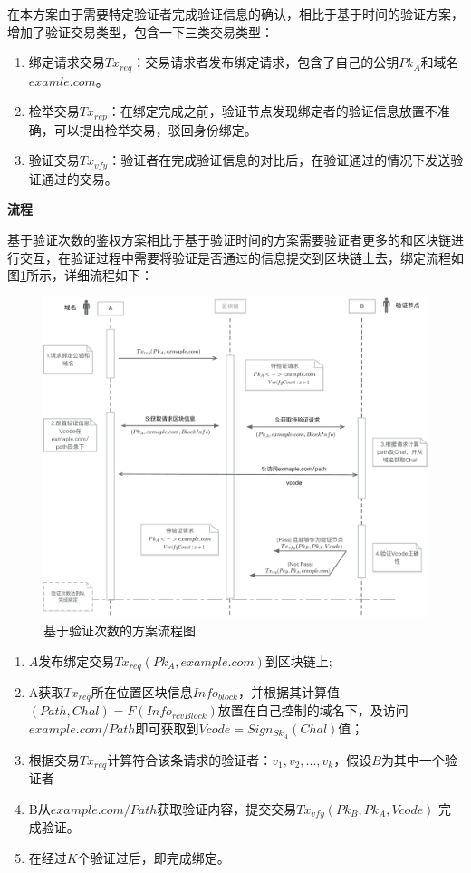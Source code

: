 在本方案由于需要特定验证者完成验证信息的确认，相比于基于时间的验证方案，增加了验证交易类型，包含一下三类交易类型：

\begin{enumerate}
	\item 绑定请求交易$Tx_{req}$：交易请求者发布绑定请求，包含了自己的公钥$Pk_A$和域名$examle.com$。
	\item 检举交易$Tx_{rep}$：在绑定完成之前，验证节点发现绑定者的验证信息放置不准确，可以提出检举交易，驳回身份绑定。
	\item 验证交易$Tx_{vfy}$：验证者在完成验证信息的对比后，在验证通过的情况下发送验证通过的交易。
\end{enumerate}

\noindent\textbf{流程}

基于验证次数的鉴权方案相比于基于验证时间的方案需要验证者更多的和区块链进行交互，在验证过程中需要将验证是否通过的信息提交到区块链上去，绑定流程如图\ref{fig:count_based_workflow}所示，详细流程如下：

\begin{figure}[htbp]
 	\centering
 	\includegraphics[width = 1\textwidth]{img/count_based_workflow}
 	\caption{基于验证次数的方案流程图}\label{fig:count_based_workflow}
\end{figure}

\begin{enumerate}
	\item $A$发布绑定交易$Tx_{req}(Pk_A, example.com)$到区块链上;
	\item  A获取$Tx_{req}$所在位置区块信息$Info_{block}$，并根据其计算值$(Path, Chal) = F(Info_{rcvBlock})$放置在自己控制的域名下，及访问$example.com/Path$即可获取到$Vcode = Sign_{Sk_A}(Chal)$值；
	\item 根据交易$Tx_{req}$计算符合该条请求的验证者：${v_1, v_2, ... , v_k}$，假设$B$为其中一个验证者
	\item B从$example.com/Path$获取验证内容，提交交易$Tx_{vfy}(Pk_B, Pk_A, Vcode)$ 完成验证。
	\item 在经过$K$个验证过后，即完成绑定。
\end{enumerate}

